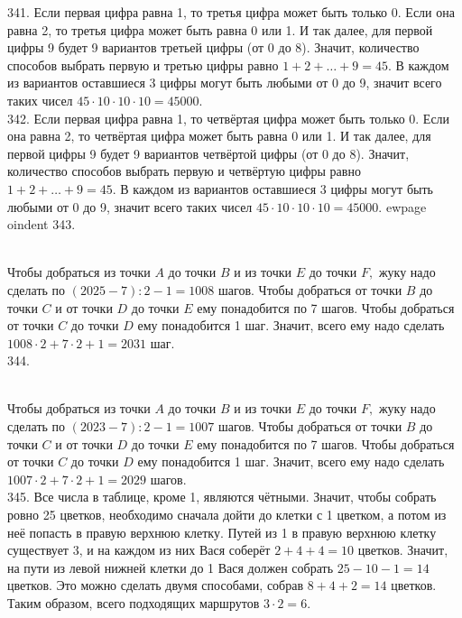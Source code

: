 341. Если первая цифра равна 1, то третья цифра может быть только 0. Если она равна 2, то третья цифра может быть равна 0 или 1. И так далее, для первой цифры 9 будет 9 вариантов третьей цифры (от 0 до 8). Значит, количество способов выбрать первую и третью цифры равно $1+2+\ldots+9=45.$ В каждом из вариантов оставшиеся 3 цифры могут быть любыми от 0 до 9, значит всего таких чисел $45\cdot10\cdot10\cdot10=45000.$\\
342. Если первая цифра равна 1, то четвёртая цифра может быть только 0. Если она равна 2, то четвёртая цифра может быть равна 0 или 1. И так далее, для первой цифры 9 будет 9 вариантов четвёртой цифры (от 0 до 8). Значит, количество способов выбрать первую и четвёртую цифры равно $1+2+\ldots+9=45.$ В каждом из вариантов оставшиеся 3 цифры могут быть любыми от 0 до 9, значит всего таких чисел $45\cdot10\cdot10\cdot10=45000.$
ewpage
oindent
343. \begin{figure}[ht!]
\end{figure}\\
Чтобы добраться из точки $A$ до точки $B$ и из точки $E$ до точки $F,$ жуку надо сделать по $(2025-7):2-1=1008$ шагов. Чтобы добраться от точки $B$ до точки $C$ и от точки $D$ до точки $E$ ему понадобится по 7 шагов. Чтобы добраться от точки $C$ до точки $D$ ему понадобится 1 шаг. Значит, всего ему надо сделать $1008\cdot2+7\cdot2+1=2031$ шаг.\\
344. \begin{figure}[ht!]
\end{figure}\\
Чтобы добраться из точки $A$ до точки $B$ и из точки $E$ до точки $F,$ жуку надо сделать по $(2023-7):2-1=1007$ шагов. Чтобы добраться от точки $B$ до точки $C$ и от точки $D$ до точки $E$ ему понадобится по 7 шагов. Чтобы добраться от точки $C$ до точки $D$ ему понадобится 1 шаг. Значит, всего ему надо сделать $1007\cdot2+7\cdot2+1=2029$ шагов.\\
345. Все числа в таблице, кроме 1, являются чётными. Значит, чтобы собрать ровно 25 цветков, необходимо сначала дойти до клетки с 1 цветком, а потом из неё попасть в правую верхнюю клетку. Путей из 1 в правую верхнюю клетку существует 3, и на каждом из них Вася соберёт $2+4+4=10$ цветков. Значит, на пути из левой нижней клетки до 1 Вася должен собрать $25-10-1=14$ цветков. Это можно сделать двумя способами, собрав $8+4+2=14$ цветков. Таким образом, всего подходящих маршрутов $3\cdot2=6.$\\
